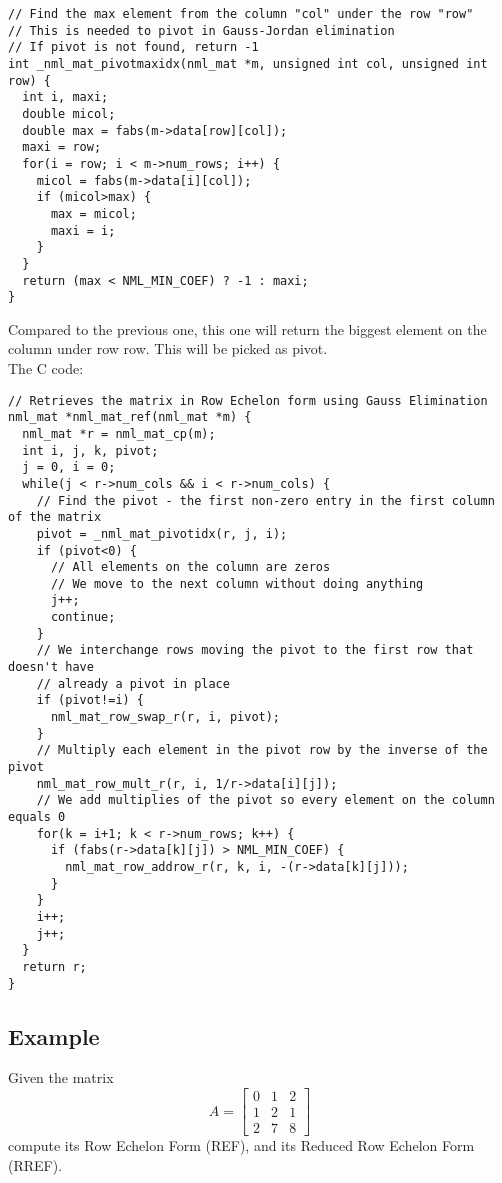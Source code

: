 \begin{verbatim}
// Find the max element from the column "col" under the row "row"
// This is needed to pivot in Gauss-Jordan elimination
// If pivot is not found, return -1
int _nml_mat_pivotmaxidx(nml_mat *m, unsigned int col, unsigned int row) {
  int i, maxi;
  double micol;
  double max = fabs(m->data[row][col]);
  maxi = row;
  for(i = row; i < m->num_rows; i++) {
    micol = fabs(m->data[i][col]);
    if (micol>max) {
      max = micol;
      maxi = i;
    }
  }
  return (max < NML_MIN_COEF) ? -1 : maxi;
} 
\end{verbatim}

Compared to the previous one, this one will return the biggest element on the column under row row. This will be picked as pivot.
\\

The C code:

\begin{verbatim}
// Retrieves the matrix in Row Echelon form using Gauss Elimination
nml_mat *nml_mat_ref(nml_mat *m) {
  nml_mat *r = nml_mat_cp(m);
  int i, j, k, pivot;
  j = 0, i = 0;
  while(j < r->num_cols && i < r->num_cols) {
    // Find the pivot - the first non-zero entry in the first column of the matrix
    pivot = _nml_mat_pivotidx(r, j, i);
    if (pivot<0) {
      // All elements on the column are zeros
      // We move to the next column without doing anything
      j++;
      continue;
    }
    // We interchange rows moving the pivot to the first row that doesn't have
    // already a pivot in place
    if (pivot!=i) {
      nml_mat_row_swap_r(r, i, pivot);
    }
    // Multiply each element in the pivot row by the inverse of the pivot
    nml_mat_row_mult_r(r, i, 1/r->data[i][j]);
    // We add multiplies of the pivot so every element on the column equals 0
    for(k = i+1; k < r->num_rows; k++) {
      if (fabs(r->data[k][j]) > NML_MIN_COEF) {
        nml_mat_row_addrow_r(r, k, i, -(r->data[k][j]));
      } 
    }
    i++;
    j++;
  }
  return r;
} 
\end{verbatim}

\subsection{Example}

\textsf{
\example Given the matrix
$$
A = \left[
\begin{array}{rrr}
0 & 1 & 2 \\
1 & 2 & 1 \\
2 & 7 & 8
\end{array}
\right]
$$
compute its Row Echelon Form (REF), and its Reduced Row Echelon Form (RREF).
}


